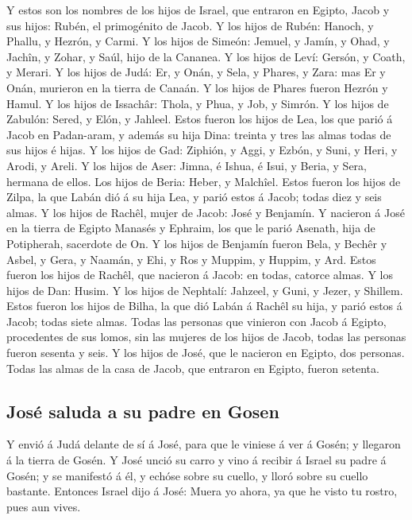  Y estos son los nombres de los hijos de Israel, que
entraron en Egipto, Jacob y sus hijos: Rubén, el primogénito de Jacob.
 Y los hijos de Rubén: Hanoch, y Phallu, y Hezrón, y Carmi.
 Y los hijos de Simeón: Jemuel, y Jamín, y Ohad, y Jachîn,
y Zohar, y Saúl, hijo de la Cananea.  Y los hijos de Leví:
Gersón, y Coath, y Merari.  Y los hijos de Judá: Er, y
Onán, y Sela, y Phares, y Zara: mas Er y Onán, murieron en la tierra de
Canaán. Y los hijos de Phares fueron Hezrón y Hamul.  Y los
hijos de Issachâr: Thola, y Phua, y Job, y Simrón.  Y los
hijos de Zabulón: Sered, y Elón, y Jahleel.  Estos fueron
los hijos de Lea, los que parió á Jacob en Padan-aram, y además su hija
Dina: treinta y tres las almas todas de sus hijos é hijas. 
Y los hijos de Gad: Ziphión, y Aggi, y Ezbón, y Suni, y Heri, y Arodi, y
Areli.  Y los hijos de Aser: Jimna, é Ishua, é Isui, y
Beria, y Sera, hermana de ellos. Los hijos de Beria: Heber, y Malchîel.
 Estos fueron los hijos de Zilpa, la que Labán dió á su
hija Lea, y parió estos á Jacob; todas diez y seis almas. 
Y los hijos de Rachêl, mujer de Jacob: José y Benjamín.  Y
nacieron á José en la tierra de Egipto Manasés y Ephraim, los que le
parió Asenath, hija de Potipherah, sacerdote de On.  Y los
hijos de Benjamín fueron Bela, y Bechêr y Asbel, y Gera, y Naamán, y
Ehi, y Ros y Muppim, y Huppim, y Ard.  Estos fueron los
hijos de Rachêl, que nacieron á Jacob: en todas, catorce almas.
 Y los hijos de Dan: Husim.  Y los hijos de
Nephtalí: Jahzeel, y Guni, y Jezer, y Shillem.  Estos
fueron los hijos de Bilha, la que dió Labán á Rachêl su hija, y parió
estos á Jacob; todas siete almas.  Todas las personas que
vinieron con Jacob á Egipto, procedentes de sus lomos, sin las mujeres
de los hijos de Jacob, todas las personas fueron sesenta y seis.
 Y los hijos de José, que le nacieron en Egipto, dos
personas. Todas las almas de la casa de Jacob, que entraron en Egipto,
fueron setenta.

\hypertarget{josuxe9-saluda-a-su-padre-en-gosen}{%
\subsection{José saluda a su padre en
Gosen}\label{josuxe9-saluda-a-su-padre-en-gosen}}

 Y envió á Judá delante de sí á José, para que le viniese á
ver á Gosén; y llegaron á la tierra de Gosén.  Y José unció
su carro y vino á recibir á Israel su padre á Gosén; y se manifestó á
él, y echóse sobre su cuello, y lloró sobre su cuello bastante.
 Entonces Israel dijo á José: Muera yo ahora, ya que he
visto tu rostro, pues aun vives.

